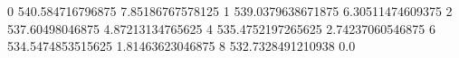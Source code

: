 0 540.584716796875 7.85186767578125
1 539.0379638671875 6.30511474609375
2 537.60498046875 4.87213134765625
4 535.4752197265625 2.74237060546875
6 534.5474853515625 1.81463623046875
8 532.7328491210938 0.0
